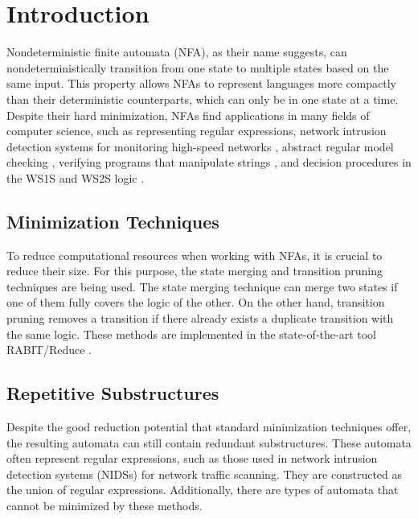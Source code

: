 \documentclass{ExcelAtFIT}
\affiliation{*%
  \href{mailto:xsedym02@stud.fit.vutbr.cz}{xsedym02@stud.fit.vutbr.cz},
  \textit{Faculty of Information Technology, Brno University of Technology}}
\begin{document}
\startdocument


\section{Introduction}
	Nondeterministic finite automata (NFA), as their name suggests, can nondeterministically transition from one state to multiple states based on the same input. This property allows NFAs to represent languages more compactly than their deterministic counterparts, which can only be in one state at a time. Despite their hard minimization, NFAs find applications in many fields of computer science, such as representing regular expressions, network intrusion detection systems for monitoring high-speed networks \cite{FPGA_based_network_scaning, ApproxRed}, abstract regular model checking \cite{ARMC}, verifying programs that manipulate strings \cite{String_constraints_for_ver}, and decision procedures in the WS1S and WS2S logic \cite{On_equivalence_checking, Nested_antichains_for_WS1S}.

	\subsection*{Minimization Techniques}
		To reduce computational resources when working with NFAs, it is crucial to reduce their size. For this purpose, the state merging \cite{Oldest_Merge,Simulation_based_minimization,On_nfa_reduction} and transition pruning \cite{Simulation_based_minimization, Lorenzo_prunning_saturation} techniques are being used. The state merging technique can merge two states if one of them fully covers the logic of the other. On the other hand, transition pruning removes a transition if there already exists a duplicate transition with the same logic. These methods are implemented in the state-of-the-art tool RABIT/Reduce \cite{RABIT}.

	\subsection*{Repetitive Substructures}
		Despite the good reduction potential that standard minimization techniques offer, the resulting automata can still contain redundant substructures. These automata often represent regular expressions, such as those used in network intrusion detection systems (NIDSs) for network traffic scanning. They are constructed as the union of regular expressions. Additionally, there are types of automata that cannot be minimized by these methods.
\end{document}
